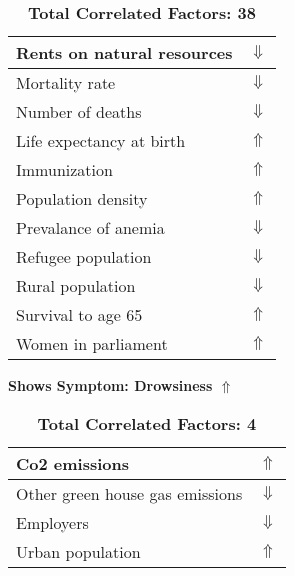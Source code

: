 \documentclass[12pt,notitlepage,oneside]{report}
\begin{document}
\begin{table}[!htb]
\begin{tabular}{|l|l|}
Rents on natural resources & $\Downarrow$\\ \hline
Mortality rate & $\Downarrow$\\ \hline
Number of deaths & $\Downarrow$\\ \hline
Life expectancy at birth & $\Uparrow$\\ \hline
Immunization & $\Uparrow$\\ \hline
Population density & $\Uparrow$\\ \hline
Prevalance of anemia & $\Downarrow$\\ \hline
Refugee population & $\Downarrow$\\ \hline
Rural population & $\Downarrow$\\ \hline
Survival to age 65 & $\Uparrow$\\ \hline
Women in parliament & $\Uparrow$\\ \hline
\end{tabular}
\caption*{\textbf{Total Correlated Factors: 38}}
\end{table}
\clearpage
\begin{table}[!htb]
\caption{\textbf{Shows Symptom: Drowsiness $\Uparrow$}}
\centering
\label{Correlated Socio-economic Factors0}
\begin{tabular}{|l|l|}
\hline
Co2 emissions & $\Uparrow$\\ \hline
Other green house gas emissions & $\Downarrow$\\ \hline
Employers & $\Downarrow$\\ \hline
Urban population & $\Uparrow$\\ \hline
\end{tabular}
\caption*{\textbf{Total Correlated Factors: 4}}
\end{table}
\end{document}
